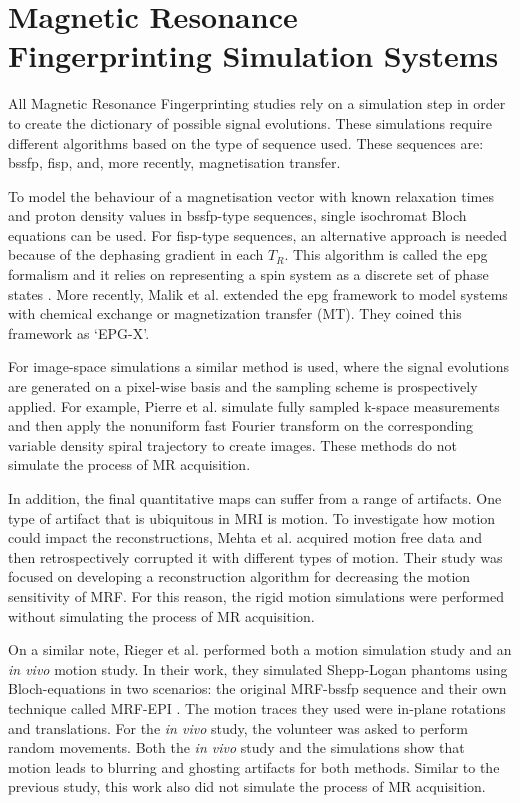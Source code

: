 \section{Magnetic Resonance Fingerprinting Simulation Systems}
\label{chapterlabel2sec2}

All Magnetic Resonance Fingerprinting studies rely on a simulation step in order to create the dictionary of possible signal evolutions.
These simulations require different algorithms based on the type of sequence used.
These sequences are: \ac{bssfp}, \ac{fisp}, and, more recently, magnetisation transfer.

\hfill

To model the behaviour of a magnetisation vector with known relaxation times and proton density values in \ac{bssfp}-type sequences, single isochromat Bloch equations can be used. 
For \ac{fisp}-type sequences, an alternative approach is needed because of the dephasing gradient in each $T_R$.
This algorithm is called the \ac{epg} formalism and it relies on representing a spin system as a discrete set of phase states \cite{Weigel2015}.
More recently, Malik et al. \cite{Malik2017} extended the \ac{epg} framework to model systems with chemical exchange or magnetization transfer (MT). They coined this framework as `EPG-X'.

\hfill

For image-space simulations a similar method is used, where the signal evolutions are generated on a pixel-wise basis and the sampling scheme is prospectively applied.
For example, Pierre et al. \cite{Pierre2016} simulate fully sampled k-space measurements and then apply the nonuniform fast Fourier transform on the corresponding variable density spiral trajectory to create images. 
These methods do not simulate the process of MR acquisition.

\hfill

In addition, the final quantitative maps can suffer from a range of artifacts.
One type of artifact that is ubiquitous in MRI is motion.
To investigate how motion could impact the reconstructions, Mehta et al. \cite{Mehta2017} acquired motion free data and then retrospectively corrupted it with different types of motion.
Their study was focused on developing a reconstruction algorithm for decreasing the motion sensitivity of MRF.
For this reason, the rigid motion simulations were performed without simulating the process of MR acquisition.

\hfill

On a similar note, Rieger et al. \cite{Rieger2017} performed both a motion simulation study and an \textit{in vivo} motion study.
In their work, they simulated Shepp-Logan phantoms using Bloch-equations in two scenarios: the original MRF-\ac{bssfp} sequence \cite{Ma2013} and their own technique called MRF-EPI \cite{Rieger2016}. 
The motion traces they used were in-plane rotations and translations.
For the \textit{in vivo} study, the volunteer was asked to perform random movements.
Both the \textit{in vivo} study and the simulations show that motion leads to blurring and ghosting artifacts for both methods.
Similar to the previous study, this work also did not simulate the process of MR acquisition.

